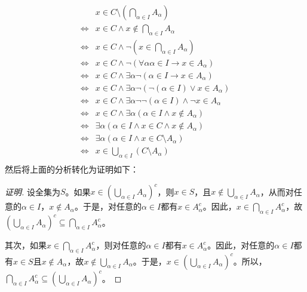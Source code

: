 \documentclass{book}[oneside]
\begin{document}
\begin{CJK*}{UTF8}{gbsn}
  \begin{equation*}
    \begin{split}
      &x \in C\setminus (\bigcap_{\alpha \in I}A_{\alpha})\\
      \Leftrightarrow &x \in C \land x \notin \bigcap_{\alpha \in I}A_{\alpha}\\
      \Leftrightarrow &x \in C \land \lnot (x \in \bigcap_{\alpha \in I}A_{\alpha})\\
      \Leftrightarrow &x \in C \land \lnot (\forall \alpha \alpha \in I \to x \in A_{\alpha})\\
      \Leftrightarrow &x \in C \land \exists \alpha \lnot (\alpha \in I \to x \in A_{\alpha})\\
      \Leftrightarrow &x \in C \land \exists \alpha \lnot (\lnot (\alpha \in I) \lor x \in A_{\alpha})\\
      \Leftrightarrow &x \in C \land \exists \alpha \lnot \lnot (\alpha \in I) \land \lnot x\in A_{\alpha}\\
      \Leftrightarrow &x \in C \land \exists \alpha (\alpha \in I \land x\notin A_{\alpha})\\
      \Leftrightarrow &\exists \alpha (\alpha \in I \land x\in C \land x \notin A_{\alpha})\\
      \Leftrightarrow &\exists \alpha (\alpha \in I \land x\in C\setminus A_{\alpha})\\
      \Leftrightarrow &x \in \bigcup_{\alpha \in I} (C\setminus A_{\alpha}) \\
    \end{split}
  \end{equation*}
  然后将上面的分析转化为证明如下：  
  \begin{proof}[证明]
    设全集为$S$。如果$x \in (\bigcup_{\alpha \in I}A_{\alpha})^c$，则$x\in S$，且$x \notin \bigcup_{\alpha \in I}A_{\alpha}$，从而对任意的$\alpha \in I$，$x\notin A_{\alpha}$。于是，对任意的$\alpha \in I$都有$x\in A_{\alpha}^c$。因此，$x \in \bigcap_{\alpha \in I} A_{\alpha}^c$，故$(\bigcup_{\alpha \in I}A_{\alpha})^c\subseteq \bigcap_{\alpha\in I}A_{\alpha}^c$。

    其次，如果$x\in \bigcap_{\alpha\in I}A_{\alpha}^c$，则对任意的$\alpha \in I$都有$x\in A_{\alpha}^c$。因此，对任意的$\alpha \in I$都有$x\in S$且$x\notin A_{\alpha}$，故$x\notin \bigcup_{\alpha \in I}A_{\alpha}$。于是，$x \in (\bigcup_{\alpha \in I}A_{\alpha})^c$。所以，$\bigcap_{\alpha\in I}A_{\alpha}^c\subseteq (\bigcup_{\alpha \in I}A_{\alpha})^c$。


\end{proof}
\end{CJK*}
\end{document}
